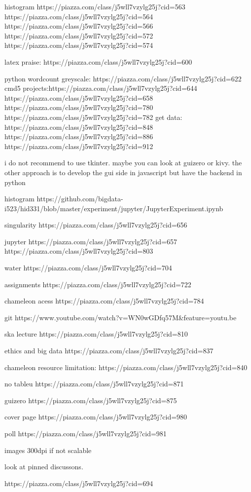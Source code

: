 histogram
https://piazza.com/class/j5wll7vzylg25j?cid=563
https://piazza.com/class/j5wll7vzylg25j?cid=564
https://piazza.com/class/j5wll7vzylg25j?cid=566
https://piazza.com/class/j5wll7vzylg25j?cid=572
https://piazza.com/class/j5wll7vzylg25j?cid=574

latex praise:
https://piazza.com/class/j5wll7vzylg25j?cid=600

python
wordcount
greyscale: https://piazza.com/class/j5wll7vzylg25j?cid=622
cmd5 projects:https://piazza.com/class/j5wll7vzylg25j?cid=644
https://piazza.com/class/j5wll7vzylg25j?cid=658
https://piazza.com/class/j5wll7vzylg25j?cid=780
https://piazza.com/class/j5wll7vzylg25j?cid=782
get data: https://piazza.com/class/j5wll7vzylg25j?cid=848
https://piazza.com/class/j5wll7vzylg25j?cid=886
https://piazza.com/class/j5wll7vzylg25j?cid=912

i do not recommend to use tkinter. maybe you can look at guizero or kivy. the other approach is to develop the gui side in javascript but have the backend in python

histogram
https://github.com/bigdata-i523/hid331/blob/master/experiment/jupyter/JupyterExperiment.ipynb

singularity
https://piazza.com/class/j5wll7vzylg25j?cid=656

jupyter
https://piazza.com/class/j5wll7vzylg25j?cid=657
https://piazza.com/class/j5wll7vzylg25j?cid=803

water
https://piazza.com/class/j5wll7vzylg25j?cid=704

assignments
https://piazza.com/class/j5wll7vzylg25j?cid=722

chameleon acess
https://piazza.com/class/j5wll7vzylg25j?cid=784

git
https://www.youtube.com/watch?v=WN0wGDfq57M&feature=youtu.be

ska lecture
https://piazza.com/class/j5wll7vzylg25j?cid=810

ethics and big data
https://piazza.com/class/j5wll7vzylg25j?cid=837

chameleon
resource limitation: https://piazza.com/class/j5wll7vzylg25j?cid=840

no tableu
https://piazza.com/class/j5wll7vzylg25j?cid=871

guizero
https://piazza.com/class/j5wll7vzylg25j?cid=875

cover page
https://piazza.com/class/j5wll7vzylg25j?cid=980

poll
https://piazza.com/class/j5wll7vzylg25j?cid=981

images 300dpi if not scalable

look at pinned discussons.

https://piazza.com/class/j5wll7vzylg25j?cid=694
